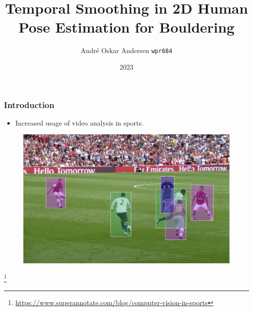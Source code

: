 \documentclass{beamer}
\begin{document}
\beamertemplatenavigationsymbolsempty

\title{Temporal Smoothing in 2D Human Pose Estimation for Bouldering}

\author{André Oskar Andersen
\newline \small \texttt{wpr684}}


\date{2023}

\newcommand\unfootnote[1]{%
  \begingroup
  \renewcommand\thefootnote{}\footnote{#1}%
  \addtocounter{footnote}{-1}%
  \endgroup
}

\frame{\titlepage}

\begin{frame}
    \frametitle{Introduction}
    \begin{minipage}{0.5\textwidth}
        \begin{itemize}
            \item<1-> Increased usage of video analysis in sports.
        \end{itemize}
    \end{minipage} \hfill
    \begin{minipage}{0.45\textwidth}
        \begin{figure}
            \center
            \includegraphics[width = \textwidth]{./entities/soccer_cv.png}
        \end{figure}
    \end{minipage}
    \unfootnote{\tiny \url{https://www.superannotate.com/blog/computer-vision-in-sports}}
\end{frame}
\end{document}
